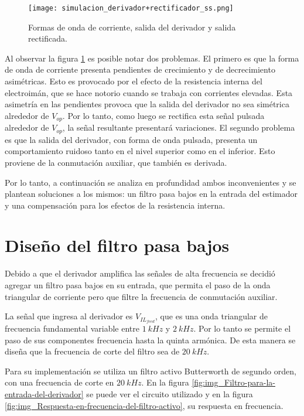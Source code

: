 \begin{figure}[H]
	\centering
	\texttt{[image: simulacion\_derivador+rectificador\_ss.png]}
	\caption{Formas de onda de corriente, salida del derivador y salida rectificada.}
	\label{fig:img_simulacion_derivador+rectificador_ss}
\end{figure}

Al observar la figura \ref{fig:img_simulacion_derivador+rectificador_ss} es posible notar dos problemas. El primero es que la forma de onda de corriente presenta pendientes de crecimiento y de decrecimiento asimétricas. Esto es provocado por el efecto de la resistencia interna del electroimán, que se hace notorio cuando se trabaja con corrientes elevadas. Esta asimetría en las pendientes provoca que la salida del derivador no sea simétrica alrededor de $V_{op}$. Por lo tanto, como luego se rectifica esta señal pulsada alrededor de $V_{op}$, la señal resultante presentará variaciones. El segundo problema es que la salida del derivador, con forma de onda pulsada, presenta un comportamiento ruidoso tanto en el nivel superior como en el inferior. Esto proviene de la conmutación auxiliar, que también es derivada. 

Por lo tanto, a continuación se analiza en profundidad ambos inconvenientes y se plantean soluciones a los mismos: un filtro pasa bajos en la entrada del estimador y una compensación para los efectos de la resistencia interna.

\section{Diseño del filtro pasa bajos}

Debido a que el derivador amplifica las señales de alta frecuencia se decidió agregar un filtro pasa bajos en su entrada, que permita el paso de la onda triangular de corriente pero que filtre la frecuencia de conmutación auxiliar. 

La señal que ingresa al derivador es $V_{IL_{feed}}$, que es una onda triangular de frecuencia fundamental variable entre $1\:kHz$ y $2\:kHz$. Por lo tanto se permite el paso de sus componentes frecuencia hasta la quinta armónica. De esta manera se diseña que la frecuencia de corte del filtro sea de $20\:kHz$.

Para su implementación se utiliza un filtro activo Butterworth de segundo orden, con una frecuencia de corte en $20\:kHz$. En la figura  \ref{fig:img_Filtro-para-la-entrada-del-derivador} se puede ver el circuito utilizado y en la figura \ref{fig:img_Respuesta-en-frecuencia-del-filtro-activo}, su respuesta en frecuencia.

